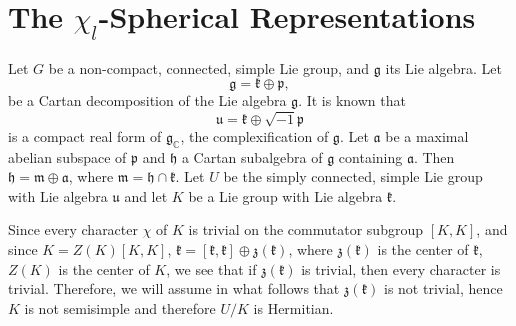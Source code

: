 \documentclass[11pt,a4paper]{amsart}
\theoremstyle{definition}
\numberwithin{equation}{section}
\begin{document}
\section{The $\chi_l$-Spherical Representations}\label{Spherical Representations}
Let $G$ be a  non-compact, connected, simple  Lie group, and  $\mathfrak{g}$ its Lie algebra. Let $$ \mathfrak{g}= \mathfrak{k}\oplus \mathfrak{p}, $$  be  a Cartan decomposition of the Lie algebra $\mathfrak{g}$.   It is known that  $$ \mathfrak{u}= \mathfrak{k}\oplus \sqrt{-1}\mathfrak{p} $$ is a compact real form of $\mathfrak{g}_\mathbb{C}$, the complexification of $\mathfrak{g}$. Let $ \mathfrak{ a}$ be a maximal abelian  subspace of $\mathfrak{p}$ and $\mathfrak{h}$   a Cartan subalgebra of $\mathfrak{g}$ containing $\mathfrak{a}$. Then 
$ \mathfrak{h}= \mathfrak{m} \oplus \mathfrak{a}$, where $\mathfrak{m}= \mathfrak{ h} \cap \mathfrak{k}$. 
{    Let $U$ be the simply connected, simple  Lie group with Lie algebra $\mathfrak{u}$ and let $K$ be a Lie group with Lie algebra $\mathfrak{k}$.}
 

Since every character $\chi$ of $K$ is trivial on the commutator subgroup $\left[K,K \right]$, and since $K=Z\left(K \right)\left[K,K \right] $, $\mathfrak{k}= [\mathfrak{k},\mathfrak{k}]\oplus\mathfrak{z}(\mathfrak{k})$, where $\mathfrak{z}(\mathfrak{k})$ is   the center of $\mathfrak{k}$, 
$Z(K)$  is the center of $K$, we see that if $\mathfrak{z}(\mathfrak{k}) $ is trivial, then every character is trivial. Therefore, we will assume in what follows that $\mathfrak{z}(\mathfrak{k}) $ is not trivial, hence $K$ is not semisimple and therefore $U/K$ is Hermitian.
\end{document}
